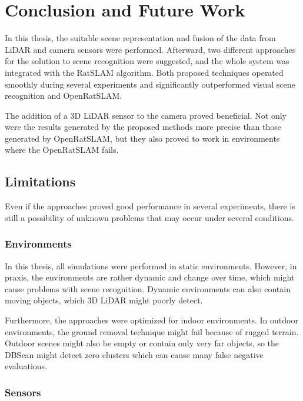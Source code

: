 \chapter{Conclusion and Future Work}\label{chapter:conclusion}

In this thesis, the suitable scene representation and fusion of the data from LiDAR and camera sensors were performed. Afterward, two different approaches for the solution to scene recognition were suggested, and the whole system was integrated with the RatSLAM algorithm. Both proposed techniques operated smoothly during several experiments and significantly outperformed visual scene recognition and OpenRatSLAM. \par
The addition of a 3D LiDAR sensor to the camera proved beneficial. Not only were the results generated by the proposed methods more precise than those generated by OpenRatSLAM, but they also proved to work in environments where the OpenRatSLAM fails.

\section{Limitations}

Even if the approaches proved good performance in several experiments, there is still a possibility of unknown problems that may occur under several conditions.

\subsection*{Environments}

In this thesis, all simulations were performed in static environments. However, in praxis, the environments are rather dynamic and change over time, which might cause problems with scene recognition. Dynamic environments can also contain moving objects, which 3D LiDAR might poorly detect.\par
Furthermore, the approaches were optimized for indoor environments. In outdoor environments, the ground removal technique might fail because of rugged terrain. Outdoor scenes might also be empty or contain only very far objects, so the DBScan might detect zero clusters which can cause many false negative evaluations.

\subsection*{Sensors}

